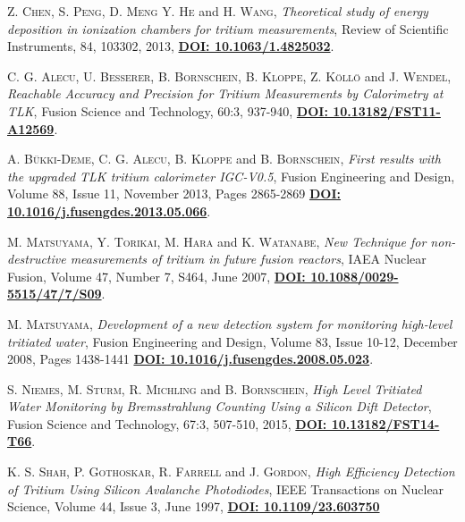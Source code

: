 \begin{thebibliography}{100}
 \textsc{Z. Chen}, \textsc{S. Peng}, \textsc{D. Meng} \textsc{Y. He} and \textsc{H. Wang},
\textit{Theoretical study of energy deposition in ionization chambers for tritium measurements}, Review of Scientific Instruments, 84, 103302, 2013, \href{https://dx.doi.org/10.1063/1.4825032}{\textbf{DOI: 10.1063/1.4825032}}.

 \textsc{C. G. Alecu}, \textsc{U. Besserer}, \textsc{B. Bornschein}, \textsc{B. Kloppe}, \textsc{Z. Köllö} and \textsc{J. Wendel},
\textit{Reachable Accuracy and Precision for Tritium Measurements by Calorimetry at TLK}, Fusion Science and Technology, 60:3, 937-940, \href{https://doi.org/10.13182/FST11-A12569}{\textbf{DOI: 10.13182/FST11-A12569}}.

 \textsc{A. Bükki-Deme}, \textsc{C. G. Alecu}, \textsc{B. Kloppe} and \textsc{B. Bornschein},
\textit{First results with the upgraded TLK tritium calorimeter IGC-V0.5}, Fusion Engineering and Design, Volume 88, Issue 11, November 2013, Pages 2865-2869 \href{https://doi.org/10.1016/j.fusengdes.2013.05.066}{\textbf{DOI: 10.1016/j.fusengdes.2013.05.066}}.

 \textsc{M. Matsuyama}, \textsc{Y. Torikai}, \textsc{M. Hara} and \textsc{K. Watanabe},
\textit{New Technique for non-destructive measurements of tritium in future fusion reactors}, IAEA Nuclear Fusion, Volume 47, Number 7, S464, June 2007, \href{https://doi.org/10.1088/0029-5515/47/7/S09}{\textbf{DOI: 10.1088/0029-5515/47/7/S09}}.

 \textsc{M. Matsuyama},
\textit{Development of a new detection system for monitoring high-level tritiated water}, Fusion Engineering and Design, Volume 83, Issue 10-12, December 2008, Pages 1438-1441 \href{https://doi.org/10.1016/j.fusengdes.2008.05.023}{\textbf{DOI: 10.1016/j.fusengdes.2008.05.023}}.

 \textsc{S. Niemes}, \textsc{M. Sturm}, \textsc{R. Michling} and \textsc{B. Bornschein},
\textit{High Level Tritiated Water Monitoring by Bremsstrahlung Counting Using a Silicon Dift Detector}, Fusion Science and Technology, 67:3, 507-510, 2015, \href{https://doi.org/10.13182/FST14-T66}{\textbf{DOI: 10.13182/FST14-T66}}.

 \textsc{K. S. Shah}, \textsc{P. Gothoskar}, \textsc{R. Farrell} and \textsc{J. Gordon},
\textit{High Efficiency Detection of Tritium Using Silicon Avalanche Photodiodes}, IEEE Transactions on Nuclear Science, Volume 44, Issue 3, June 1997, \href{https://doi.org/10.1109/23.603750}{\textbf{DOI: 10.1109/23.603750}}


\end{thebibliography}
